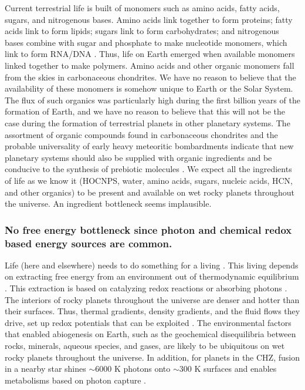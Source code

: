 Current terrestrial life is built of monomers such as amino acids, fatty acids,
sugars, and nitrogenous bases. Amino acids link together to form proteins; fatty acids link to form lipids; sugars link to form carbohydrates; 
and nitrogenous bases combine with sugar and phosphate to make nucleotide monomers, which link to form RNA/DNA \citep{Lineweaver2012}. 
Thus, life on Earth emerged when available monomers linked together to make polymers. 
Amino acids and other organic monomers fall from the skies in carbonaceous chondrites.
We have no reason to believe that the availability of these monomers is somehow unique to Earth or the Solar System.
The flux of such organics was particularly high during the first billion years of the formation of Earth, and we have no reason to believe
that this will not be the case during the formation of terrestrial planets in other planetary systems.
The assortment of organic compounds found in carbonaceous chondrites
and the probable universality of early heavy meteoritic bombardments indicate that new planetary systems should also be
supplied with organic ingredients and be conducive to the synthesis of prebiotic molecules  \citep{Ehrenfreund2000,Herbst2009,Tielens2013}. We expect all the ingredients of life as we know it (HOCNPS, water, amino acids, sugars, nucleic acids, HCN, and other organics)
to be present and available on wet rocky planets throughout the universe.  An ingredient bottleneck seems implausible.

\subsubsection{No free energy bottleneck since photon and chemical redox based energy sources are common.}

Life (here and elsewhere) needs to do something for a living \citep{Conrad2001,Nealson2013}.
This living depends on extracting free energy from an environment out of thermodynamic equilibrium \citep{Branscomb2013}. 
This extraction is based on catalyzing redox reactions or absorbing photons \citep{Kleidon2011}.
The interiors of rocky planets throughout the universe are denser and hotter than their surfaces.
Thus, thermal gradients, density gradients, and the fluid flows they drive, set up redox potentials that can be exploited \citep{Nisbet2014}.
The environmental factors that enabled abiogenesis on Earth, such as the geochemical  disequilibria between rocks, minerals, aqueous species, and gases, are likely to be ubiquitous 
on wet rocky planets throughout the universe. 
In addition, for planets in the CHZ, fusion in a nearby star shines $\sim$6000 K photons onto $\sim$300 K surfaces and enables
metabolisms based on photon capture \citep{Lineweaver2008a,Annila2008}.

